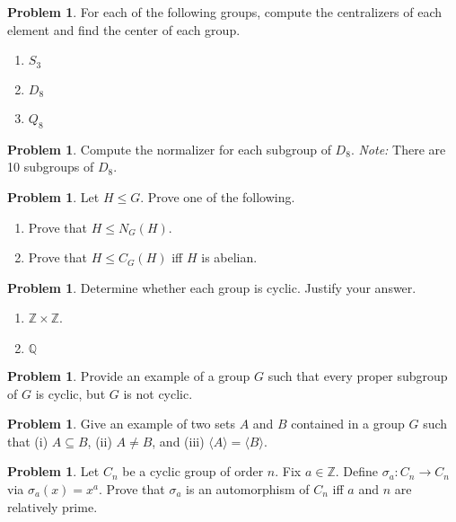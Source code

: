 \documentclass[11pt]{scrartcl}
\theoremstyle{definition}
\newtheorem{problem}[theorem]{Problem}
\begin{document}
\begin{problem}
For each of the following groups, compute the centralizers of each element and find the center of each group.
\begin{enumerate}[label=\rm{(\alph*)}]
\item $S_3$
\item $D_8$
\item $Q_8$
\end{enumerate}
\end{problem}

\begin{problem}
Compute the normalizer for each subgroup of $D_8$.  \emph{Note:} There are 10 subgroups of $D_8$.
\end{problem}

\begin{problem}
Let $H\leq G$.  Prove one of the following.
\begin{enumerate}[label=\rm{(\alph*)}]
\item Prove that $H\leq N_G(H)$.
\item Prove that $H\leq C_G(H)$ iff $H$ is abelian.
\end{enumerate}
\end{problem}

\begin{problem}
Determine whether each group is cyclic.  Justify your answer.
\begin{enumerate}[label=\rm{(\alph*)}]
\item $\mathbb{Z}\times \mathbb{Z}$.
\item $\mathbb{Q}$
\end{enumerate}
\end{problem}

\begin{problem}
Provide an example of a group $G$ such that every proper subgroup of $G$ is cyclic, but $G$ is not cyclic.
\end{problem}

\begin{problem}
Give an example of two sets $A$ and $B$ contained in a group $G$ such that (i) $A\subseteq B$, (ii) $A\neq B$, and (iii) $\langle A\rangle=\langle B\rangle$.
\end{problem}

\begin{problem}
Let $C_n$ be a cyclic group of order $n$. Fix $a\in\mathbb{Z}$.  Define $\sigma_a:C_n\to C_n$ via $\sigma_a(x)=x^a$.  Prove that $\sigma_a$ is an automorphism of $C_n$ iff $a$ and $n$ are relatively prime.
\end{problem}
\end{document}
